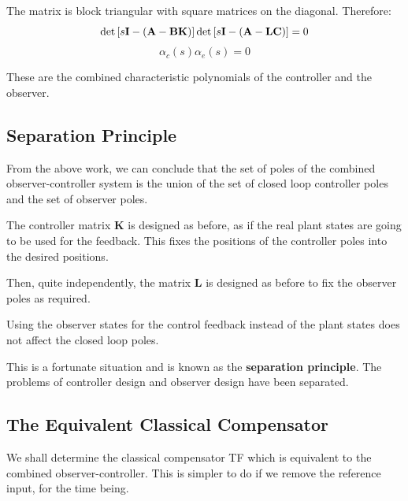 The matrix is block triangular with square matrices on the diagonal. Therefore:
\[
	\det \left[ {s{\bf{I}} - \left( {{\bf{A}} - {\bf{BK}}} \right)} \right]\det\left[ {s{\bf{I}} - \left( {{\bf{A}} - {\bf{LC}}} \right)} \right] = 0 
\]
\[
	\alpha_c(s)\alpha_e(s) = 0 
\]
 

These are the combined characteristic polynomials of the controller and the observer.





\subsection*{Separation Principle} %
\label{sub:separation_principle}

From the above work, we can conclude that the set of poles of the combined observer-controller system is the union of the set of closed loop controller poles and the set of observer poles.

The controller matrix  $\mathbf{K}$  is designed as before, as if the real plant states are going to be used for the feedback. This fixes the positions of the controller poles into the desired positions.

Then, quite independently, the matrix $\mathbf{L}$ is designed as before to fix the observer poles as required.

Using the observer states for the control feedback instead of the plant states does not affect the closed loop poles.

This is a fortunate situation and is known as the \textbf{separation principle}. The problems of controller design and observer design have been separated.
 


\subsection*{The Equivalent Classical Compensator} %
\label{sec:the_equivalent_classical_compensator}

We shall determine the classical compensator TF which is equivalent to the combined observer-controller. This is simpler to do if we remove the reference input, for the time being.
\begin{center}
\end{center}

